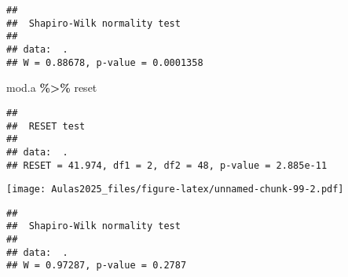 \documentclass[
]{book}
\newenvironment{Shaded}{\begin{snugshade}}{\end{snugshade}}
\newcommand{\AttributeTok}[1]{\textcolor[rgb]{0.13,0.29,0.53}{#1}}
\newcommand{\CommentTok}[1]{\textcolor[rgb]{0.56,0.35,0.01}{\textit{#1}}}
\newcommand{\DecValTok}[1]{\textcolor[rgb]{0.00,0.00,0.81}{#1}}
\newcommand{\FunctionTok}[1]{\textcolor[rgb]{0.13,0.29,0.53}{\textbf{#1}}}
\newcommand{\NormalTok}[1]{#1}
\newcommand{\OtherTok}[1]{\textcolor[rgb]{0.56,0.35,0.01}{#1}}
\newcommand{\SpecialCharTok}[1]{\textcolor[rgb]{0.81,0.36,0.00}{\textbf{#1}}}
\begin{document}
\begin{verbatim}
## 
##  Shapiro-Wilk normality test
## 
## data:  .
## W = 0.88678, p-value = 0.0001358
\end{verbatim}

\begin{Shaded}
\begin{Highlighting}[]
\NormalTok{mod.a }\SpecialCharTok{\%\textgreater{}\%}
\NormalTok{    reset}
\end{Highlighting}
\end{Shaded}

\begin{verbatim}
## 
##  RESET test
## 
## data:  .
## RESET = 41.974, df1 = 2, df2 = 48, p-value = 2.885e-11
\end{verbatim}

\begin{Shaded}
\end{Shaded}

\texttt{[image: Aulas2025\_files/figure-latex/unnamed-chunk-99-2.pdf]}

\begin{Shaded}
\end{Shaded}

\begin{verbatim}
## 
##  Shapiro-Wilk normality test
## 
## data:  .
## W = 0.97287, p-value = 0.2787
\end{verbatim}

\begin{Shaded}
\end{Shaded}
\end{document}
